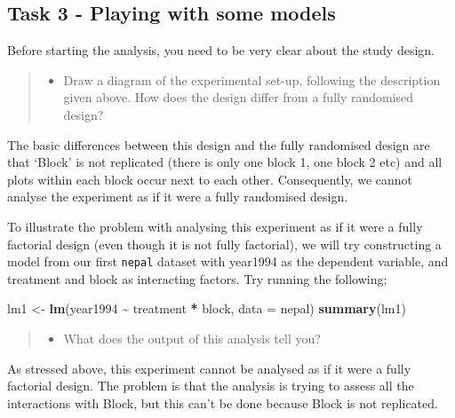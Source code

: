 \documentclass[
]{book}
\newenvironment{Shaded}{\begin{snugshade}}{\end{snugshade}}
\newcommand{\AttributeTok}[1]{\textcolor[rgb]{0.13,0.29,0.53}{#1}}
\newcommand{\FunctionTok}[1]{\textcolor[rgb]{0.13,0.29,0.53}{\textbf{#1}}}
\newcommand{\NormalTok}[1]{#1}
\newcommand{\OtherTok}[1]{\textcolor[rgb]{0.56,0.35,0.01}{#1}}
\newcommand{\SpecialCharTok}[1]{\textcolor[rgb]{0.81,0.36,0.00}{\textbf{#1}}}
\providecommand{\tightlist}{%
  \setlength{\itemsep}{0pt}\setlength{\parskip}{0pt}}
\begin{document}
\hypertarget{task-3---playing-with-some-models}{%
\subsection{Task 3 - Playing with some models}\label{task-3---playing-with-some-models}}

Before starting the analysis, you need to be very clear about the study design.

\begin{quote}
\begin{itemize}
\tightlist
\item
  Draw a diagram of the experimental set-up, following the description given above. How does the design differ from a fully randomised design?
\end{itemize}
\end{quote}

The basic differences between this design and the fully randomised design are that `Block' is not replicated (there is only one block 1, one block 2 etc) and all plots within each block occur next to each other. Consequently, we cannot analyse the experiment as if it were a fully randomised design.

To illustrate the problem with analysing this experiment as if it were a fully factorial design (even though it is not fully factorial), we will try constructing a model from our first \texttt{nepal} dataset with year1994 as the dependent variable, and treatment and block as interacting factors. Try running the following;

\begin{Shaded}
\begin{Highlighting}[]
\NormalTok{lm1 }\OtherTok{\textless{}{-}} \FunctionTok{lm}\NormalTok{(year1994 }\SpecialCharTok{\textasciitilde{}}\NormalTok{ treatment }\SpecialCharTok{*}\NormalTok{ block, }\AttributeTok{data =}\NormalTok{ nepal)}
\FunctionTok{summary}\NormalTok{(lm1)}
\end{Highlighting}
\end{Shaded}

\begin{quote}
\begin{itemize}
\tightlist
\item
  What does the output of this analysis tell you?
\end{itemize}
\end{quote}

As stressed above, this experiment cannot be analysed as if it were a fully factorial design. The problem is that the analysis is trying to assess all the interactions with Block, but this can't be done because Block is not replicated.
\end{document}
